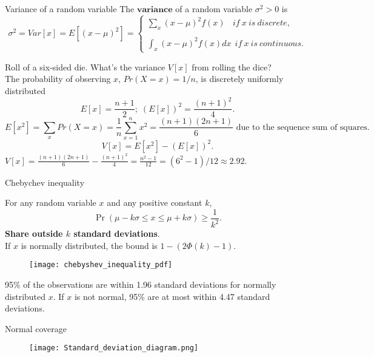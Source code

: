 \documentclass[11pt,table]{beamer}
\begin{document}
\begin{frame}{Variance of a random variable}
The $\textbf{variance}$ of a random variable $\sigma^{2}>0$ is
\begin{equation}\label{eq0} \sigma^2=Var[x] = E[(x - \mu)^{2}]=\left\{
 \begin{array}{ll}
 {\sum_{x}(x - \mu)^{2}f(x)~~~~if~ x~ is~ discrete, } \\
 {~}\\
 {\int_{x}(x - \mu)^{2}f(x)dx~~if~ x~ is~ continuous.}
 \end{array}
 \right.
\end{equation}
\begin{example} 
\scriptsize
\renewcommand{\baselinestretch}{1}
Roll of a six-sided die. What's the variance $V[x]$ from rolling the dice?\\
The probability of observing $x$, $Pr(X=x)=1/n$, is discretely uniformly distributed
$$E[x]=\frac{n+1}{2}; \; (E[x])^2=\frac{(n+1)^2}{4}.$$
$$E[x^2]=\sum_xPr(X=x)=\frac{1}{n}\sum_{x=1}^nx^2=\frac{(n+1)(2n+1)}{6} \text{ due to the sequence sum of squares}.$$
$$V[x] = E[x^{2}] - (E[x])^2.$$
 $V[x]=\frac{(n+1)(2n+1)}{6}-\frac{(n+1)^2}{4}=\frac{n^2-1}{12}=(6^2-1)/12\approx2.92.$\\
\end{example}

\end{frame}



\begin{frame}{Chebychev inequality}

For any random variable $x$ and any positive constant $k$,
$$\Pr(\mu - k\sigma \leq x \leq \mu + k\sigma) \geq \frac{1}{k^{2}}.$$
\footnotesize
\textbf{Share outside $k$ standard deviations}.\\
If $x$ is normally distributed, the bound is $1-(2\Phi(k)-1)$.
\begin{figure}[H]
\begin{center}
{\texttt{[image: chebyshev\_inequality\_pdf]}}\label{chebyshev_inequality_pdf}
\end{center}
\end{figure}
95\% of the observations are within 1.96 standard deviations for normally distributed $x$. If $x$ is not normal, 95\% are at most within 4.47 standard deviations.

\end{frame}


\begin{frame}{Normal coverage}
\begin{figure}
	\centering
		\texttt{[image: Standard\_deviation\_diagram.png]}
	\label{fig:Standard_deviation_diagram}
\end{figure}

\end{frame}
\end{document}
